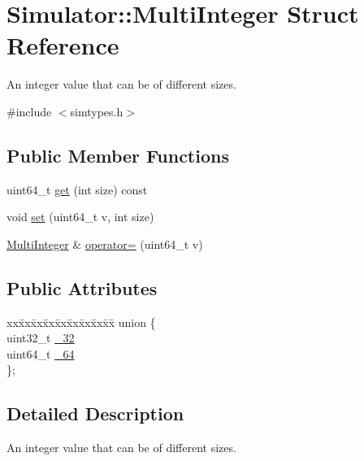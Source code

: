 \hypertarget{struct_simulator_1_1_multi_integer}{\section{Simulator\+:\+:Multi\+Integer Struct Reference}
\label{struct_simulator_1_1_multi_integer}
}


An integer value that can be of different sizes.  




{\ttfamily \#include $<$simtypes.\+h$>$}

\subsection*{Public Member Functions}
\begin{DoxyCompactItemize}
\item 
uint64\+\_\+t \hyperlink{struct_simulator_1_1_multi_integer_a3ca107c1ee1b8c6aa007e9418e79f831}{get} (int size) const 
\item 
void \hyperlink{struct_simulator_1_1_multi_integer_a96a9afccbfac6e7763f07405421cbee9}{set} (uint64\+\_\+t v, int size)
\item 
\hyperlink{struct_simulator_1_1_multi_integer}{Multi\+Integer} \& \hyperlink{struct_simulator_1_1_multi_integer_affa06fce8332a4615afba83efdd403b3}{operator=} (uint64\+\_\+t v)
\end{DoxyCompactItemize}
\subsection*{Public Attributes}
\begin{DoxyCompactItemize}
\item 
\begin{tabbing}
xx\=xx\=xx\=xx\=xx\=xx\=xx\=xx\=xx\=\kill
union \{\\
\>uint32\_t \hyperlink{struct_simulator_1_1_multi_integer_a3037bb9b00b17191eb16497974e8702c}{\_32}\\
\>uint64\_t \hyperlink{struct_simulator_1_1_multi_integer_ab32c1fdc288ec2423a23adde779cd4d7}{\_64}\\
\}; \\

\end{tabbing}\end{DoxyCompactItemize}


\subsection{Detailed Description}
An integer value that can be of different sizes. 

